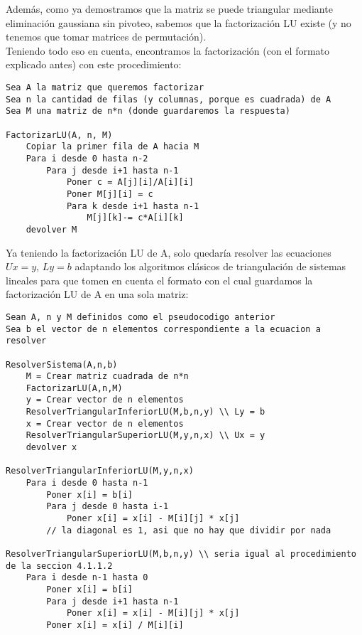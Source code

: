 Además, como ya demostramos que la matriz se puede triangular mediante eliminación gaussiana sin pivoteo, sabemos que la factorización LU existe (y no tenemos que tomar matrices de permutación). \\
Teniendo todo eso en cuenta, encontramos la factorización (con el formato explicado antes) con este procedimiento:

\newpage
\begin{lstlisting}
Sea A la matriz que queremos factorizar
Sea n la cantidad de filas (y columnas, porque es cuadrada) de A
Sea M una matriz de n*n (donde guardaremos la respuesta)

FactorizarLU(A, n, M)
    Copiar la primer fila de A hacia M
    Para i desde 0 hasta n-2
        Para j desde i+1 hasta n-1
            Poner c = A[j][i]/A[i][i]
            Poner M[j][i] = c
            Para k desde i+1 hasta n-1
                M[j][k]-= c*A[i][k]
    devolver M
\end{lstlisting}

Ya teniendo la factorización LU de A, solo quedaría resolver las ecuaciones $Ux = y$, $Ly = b$ adaptando los algoritmos clásicos de triangulación de sistemas lineales para que tomen en cuenta el formato con el cual guardamos la factorización LU de A en una sola matriz:

\begin{lstlisting}
Sean A, n y M definidos como el pseudocodigo anterior
Sea b el vector de n elementos correspondiente a la ecuacion a resolver

ResolverSistema(A,n,b)
    M = Crear matriz cuadrada de n*n
    FactorizarLU(A,n,M)
    y = Crear vector de n elementos
    ResolverTriangularInferiorLU(M,b,n,y) \\ Ly = b
    x = Crear vector de n elementos
    ResolverTriangularSuperiorLU(M,y,n,x) \\ Ux = y
    devolver x

ResolverTriangularInferiorLU(M,y,n,x)
    Para i desde 0 hasta n-1
        Poner x[i] = b[i]
        Para j desde 0 hasta i-1
            Poner x[i] = x[i] - M[i][j] * x[j]
        // la diagonal es 1, asi que no hay que dividir por nada

ResolverTriangularSuperiorLU(M,b,n,y) \\ seria igual al procedimiento de la seccion 4.1.1.2
    Para i desde n-1 hasta 0
        Poner x[i] = b[i]
        Para j desde i+1 hasta n-1
            Poner x[i] = x[i] - M[i][j] * x[j]
        Poner x[i] = x[i] / M[i][i]
\end{lstlisting}

